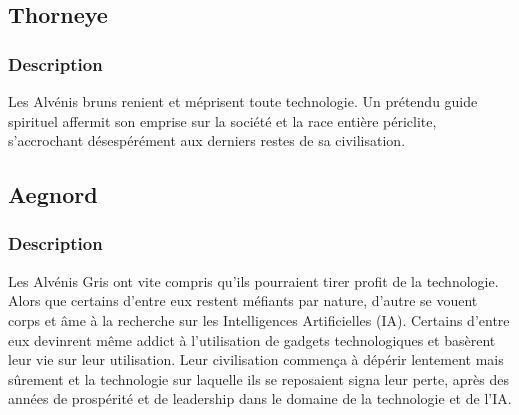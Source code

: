 \subsection{Thorneye}
\subsubsection{Description}
Les Alvénis bruns renient et méprisent toute technologie. Un prétendu guide spirituel affermit son emprise sur la société et la race entière périclite, s'accrochant désespérément aux derniers restes de sa civilisation.
\subsection{Aegnord} 
\subsubsection{Description}
Les Alvénis Gris ont vite compris qu'ils pourraient tirer profit de la technologie. Alors que certains d'entre eux restent méfiants par nature, d'autre se vouent corps et âme à la recherche sur les Intelligences Artificielles (IA). Certains d'entre eux devinrent même addict à l'utilisation de gadgets technologiques et basèrent leur vie sur leur utilisation. Leur civilisation commença à dépérir lentement mais sûrement et la technologie sur laquelle ils se reposaient signa leur perte, après des années de prospérité et de leadership dans le domaine de la technologie et de l'IA.
